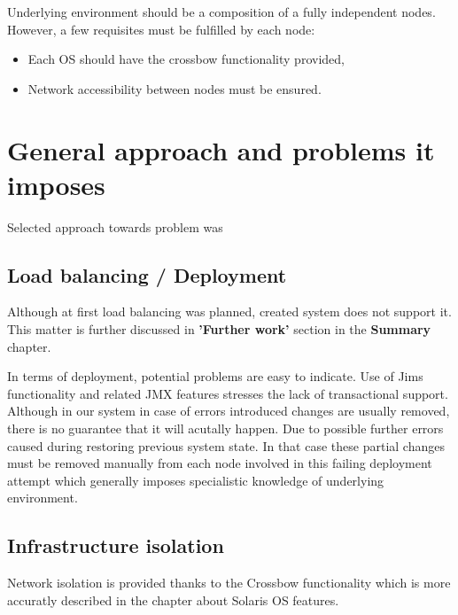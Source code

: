 \documentclass[11pt]{book}
\begin{document}
		Underlying environment should be a composition of a fully independent nodes. However, a few requisites
		must be fulfilled by each node:
		
		\begin{itemize}
			\item{Each OS should have the crossbow functionality provided, }
			\item{Network accessibility between nodes must be ensured. }
		\end{itemize}
		

    \section{General approach and problems it imposes}
	
		Selected approach towards problem was 

      \subsection{Load balancing / Deployment}
	  
		Although at first load balancing was planned, created system does not support it. This matter is further 
		discussed in \textbf{'Further work'} section in the \textbf{Summary} chapter.
		
		In terms of deployment, potential problems are easy to indicate. Use of Jims functionality and related JMX 
		features stresses the lack of transactional support. Although in our system in case of errors introduced changes
		are usually removed, there is no guarantee that it will acutally happen. Due to possible further errors caused during 
		restoring previous system state. In that case these partial changes must be removed manually from each node
		involved in this failing deployment attempt which generally imposes specialistic knowledge of underlying environment. 

      \subsection{Infrastructure isolation}
	  
		Network isolation is provided thanks to the Crossbow functionality which is more accuratly described in the chapter
		about Solaris OS features. 
		
\end{document}
